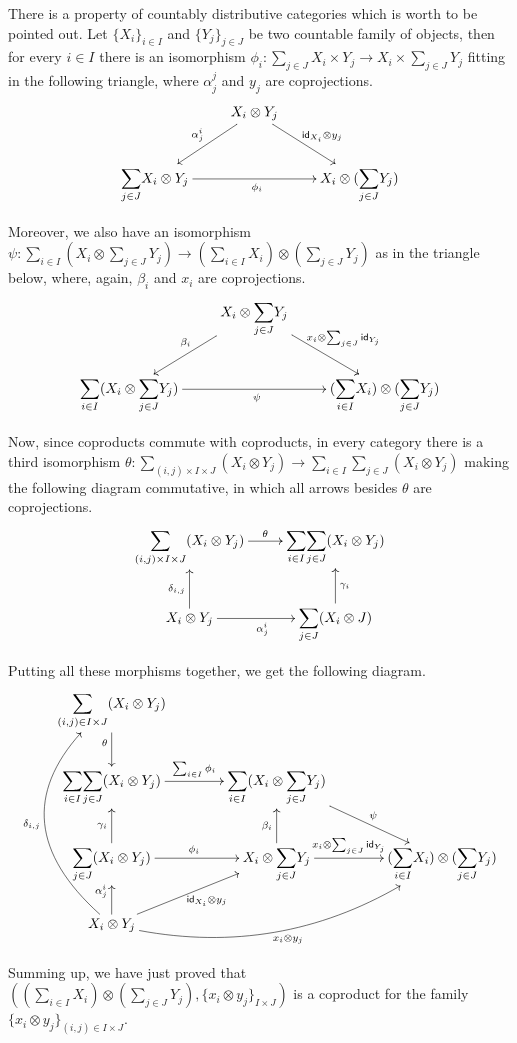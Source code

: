 \documentclass[runningheads,envcountsect]{llncs}
\def\X{\textbf {\textup{X}}}
\newcommand{\Sum}{\mathlarger{\sum}}
\newcommand{\id}[1]{\mathsf{id}_{#1}}
\begin{document}
\begin{remark}\label{rem:salv}
	There is a property of countably distributive categories which is worth to be pointed out. Let $\{X_i\}_{i\in I}$ and $\{Y_j\}_{j\in J}$ be two countable family of objects, then for every $i\in I$ there is an isomorphism $\phi_{i}\colon \sum_{j\in J}X_i\times Y_j\to X_i\times \sum_{j\in J} Y_j$ fitting in the following triangle, where $\alpha^j_j$ and $y_j$ are coprojections.
	\[\xymatrix{& X_i\otimes Y_j \ar[dl]_{\alpha^i_j} \ar[dr]^{\id{X_i}\otimes y_j} \\ \Sum_{j\in J} X_i\otimes Y_j \ar[rr]_{\phi_i}&& X_i\otimes (\Sum_{j\in J}Y_j) }\]
	
	Moreover, we also have an isomorphism $\psi\colon \sum_{i\in I}(X_i\otimes \sum_{j\in J}Y_j)\to (\sum_{i\in I}X_i) \otimes (\sum_{j\in J} Y_j)$ as in the triangle below, where, again, $\beta_i$ and $x_i$ are coprojections.
	\[\xymatrix{&X_i \otimes \Sum_{j\in J}Y_j \ar[dl]_{\beta_i} \ar[dr]^{ x_i \otimes \sum_{j\in J} \id{Y_j}} \\ \Sum_{i\in I} ( X_i \otimes \Sum_{j\in J}Y_j) \ar[rr]_{\psi}&&  (\Sum_{i\in I}X_i) \otimes (\Sum_{j\in J}Y_j)}\]
		
		Now, since coproducts commute with coproducts, in every category there is a third isomorphism $\theta \colon \sum_{(i,j)\times I\times J}(X_i\otimes Y_j) \to \sum_{i\in I}\sum_{j\in J}(X_i\otimes Y_j)$ making the following diagram commutative, in which all arrows besides $\theta$ are coprojections.
		\[\xymatrix{\Sum_{(i,j)\times I\times J}(X_i\otimes Y_j)  \ar[r]^-{\theta}& \Sum_{i\in I}\Sum_{j\in J}(X_i\otimes Y_j) \\ X_i\otimes Y_j  \ar[r]_{\alpha^i_j} \ar[u]^-{\delta_{i,j}}& \Sum_{j\in J}(X_i\otimes J) \ar[u]_-{\gamma_i}}\]
		
		Putting all these morphisms together, we get the following diagram.
	\[\xymatrix@C=38pt{\Sum_{(i,j)\in I\times J} (X_i\otimes Y_j) \ar[d]_{\theta}\\ \Sum_{i\in I} \Sum_{j\in J} (X_i\otimes Y_j) \ar[r]^-{\sum_{i\in I}\phi_i}& \Sum_{i\in I}(X_i\otimes \Sum_{j\in J} Y_j) \ar[dr]^-{\psi} \\ \Sum_{j\in J}  (X_i\otimes Y_j) \ar[r]^{\phi_i} \ar[u]^-{\gamma_{i}} & X_i\otimes \Sum_{j\in J} Y_j \ar[u]^-{\beta_i}\ar[r]^-{x_i\otimes \sum_{j\in J}\id{Y_j}}&  (\Sum_{i\in I}X_i) \otimes (\Sum_{j\in J}Y_j)\\X_i\otimes Y_j \ar@/^1.7cm/[uuu]^-{\delta_{i,j}} \ar[u]^{\alpha^i_j} \ar[ur]_{\hspace{3pt}\id{X_i}\otimes y_j} \ar@/_1cm/[urr]_{x_i\otimes y_j}}\]
	

Summing up, we have just proved that $((\sum_{i\in I}X_i) \otimes (\sum_{j\in J} Y_j), \{x_{i}\otimes y_j\}_{I\times J})$
 is a coproduct for the family $\{x_i\otimes y_j\}_{(i,j)\in I\times J}$.
\end{remark}
\end{document}
